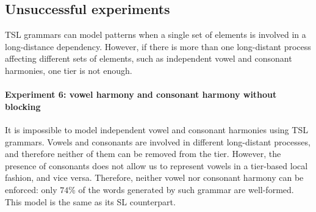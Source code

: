 %


\subsection{Unsuccessful experiments}

TSL grammars can model patterns when a single set of elements is involved in a long-distance dependency.
However, if there is more than one long-distant process affecting different sets of elements, such as independent vowel and consonant harmonies, one tier is not enough.


\paragraph{Experiment 6: vowel harmony and consonant harmony without blocking}

It is impossible to model independent vowel and consonant harmonies using TSL grammars.
Vowels and consonants are involved in different long-distant processes, and therefore neither of them can be removed from the tier.
However, the presence of consonants does not allow us to represent vowels in a tier-based local fashion, and vice versa.
Therefore, neither vowel nor consonant harmony can be enforced: only $74$\% of the words generated by such grammar are well-formed.
This model is the same as its SL counterpart.


